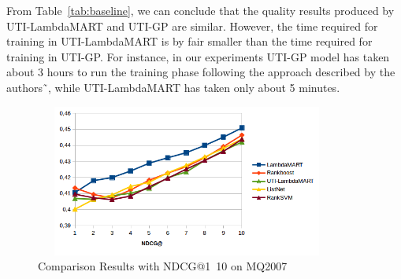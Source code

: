 \documentclass[preprint,review,10pt,3p]{elsarticle}
\begin{document}
From Table~\ref{tab:baseline}, we can conclude that the quality results produced by  UTI-LambdaMART and UTI-GP are similar. However,  the time required for training in UTI-LambdaMART is by fair smaller than the time required for training in UTI-GP. For instance, in our experiments UTI-GP model has taken about 3 hours to run the training phase following the approach described by the authors˜\cite{costa2012lepref}, while  UTI-LambdaMART has taken  only about 5 minutes. 


\begin{figure}[h!]
\begin{center}
\includegraphics[width=10cm, height=5cm]{im_ndcg_baseline.png}
\caption{Comparison Results with NDCG@1~10 on MQ2007}
\label{fig:ncdg10}
\end{center}
\end{figure}
\end{document}
